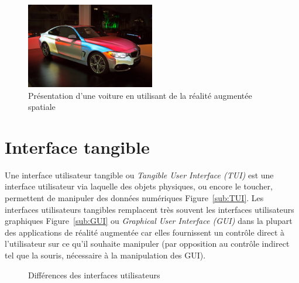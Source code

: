 \begin{figure}[H]
\centering
\includegraphics[width=0.5\textwidth]{images/SARMappingCar2}
\caption{Présentation d'une voiture en utilisant de la réalité augmentée spatiale\protect\footnotemark}
\label{fig:SAR}
\end{figure}

\section{Interface tangible}
\label{sec:tui}
Une interface utilisateur tangible\cite{ishii2008tangible} ou \emph{Tangible User Interface (TUI)} est une interface utilisateur via laquelle des objets physiques, ou encore le toucher, permettent de manipuler des données numériques Figure~\ref{sub:TUI}. Les interfaces utilisateurs tangibles remplacent très souvent les interfaces utilisateurs graphiques Figure~\ref{sub:GUI} ou \emph{Graphical User Interface (GUI)} dans la plupart des applications de réalité augmentée car elles fournissent un contrôle direct à l'utilisateur sur ce qu'il souhaite manipuler (par opposition au contrôle indirect tel que la souris, nécessaire à la manipulation des GUI).

\begin{figure}[H]
    \centering
\caption{Différences des interfaces utilisateurs\protect\footnotemark}
\label{fig:GUITUI}
\end{figure}

